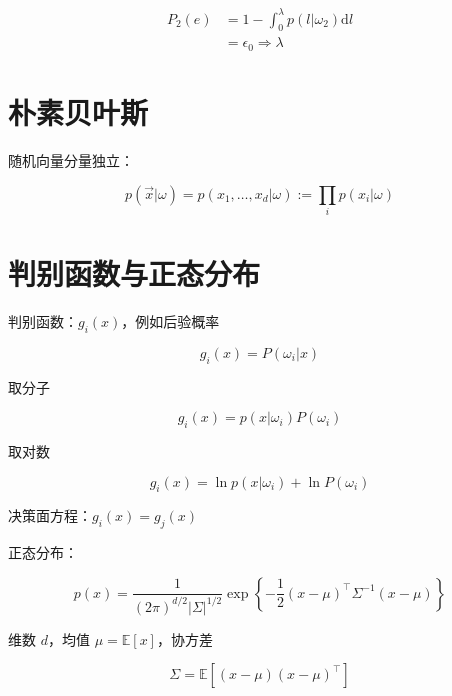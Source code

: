 \documentclass[openany,a4paper,12pt]{ctexbook}
\theoremstyle{kaiti}
\theoremstyle{normal}
\begin{document}
\begin{equation}
\begin{aligned}
  P_2\left(e \right)
  &=1-\int_0^{\lambda}{p\left(l|\omega_2 \right)\mathrm{d}l}\\
  &=\epsilon_0\Rightarrow \lambda
\end{aligned}
\end{equation}

\section{朴素贝叶斯}

随机向量分量独立：

\begin{equation}
p\left(\vec{x}|\omega \right)=p\left(x_1,\dots ,x_d|\omega \right):=\prod_ip\left(x_i|\omega \right)
\end{equation}

\section{判别函数与正态分布}

判别函数：$g_i(x)$，例如后验概率

\begin{equation}
g_i(x)=P\left(\omega_i|x \right)
\end{equation}

取分子

\begin{equation}
g_i(x)=p\left(x|\omega_i \right)P\left(\omega_i \right)
\end{equation}

取对数

\begin{equation}
g_i(x)=\ln p\left(x|\omega_i \right)+\ln P\left(\omega_i \right)
\end{equation}

决策面方程：$g_i(x)=g_j(x)$

正态分布：

\begin{equation}
p(x)=\frac{1}{\left(2\pi \right)^{d/2}|\Sigma |^{1/2}}\exp \left\{ -\frac{1}{2}\left(x-\mu \right)^{\top}\Sigma ^{-1}\left(x-\mu \right)\right\}
\end{equation}

维数 $d$，均值 $\mu =\mathbb{E} \left[x \right]$，协方差

\begin{equation}
\Sigma =\mathbb{E} \left[\left(x-\mu \right)\left(x-\mu \right)^{\top} \right]
\end{equation}
\end{document}
